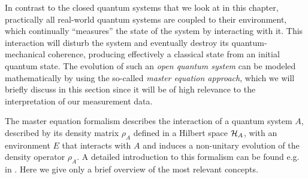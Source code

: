In contrast to the closed quantum systems that we look at in this chapter, practically all real-world quantum systems are coupled to their environment, which continually ``measures'' the state of the system by interacting with it. This interaction will disturb the system and eventually destroy its quantum-mechanical coherence, producing effectively a classical state from an initial quantum state. The evolution of such an {\it open quantum system} can be modeled mathematically by using the so-called {\it master equation approach}, which we will briefly discuss in this section since it will be of high relevance to the interpretation of our measurement data.

\smallskip

The master equation formalism describes the interaction of a quantum system $A$, described by its density matrix $\rho_A$ defined in a Hilbert space $\begin{mathcal}H\end{mathcal}_A$, with an environment $E$ that interacts with $A$ and induces a non-unitary evolution of the density operator $\rho_A$. A detailed introduction to this formalism can be found e.g. in \citep{haroche_exploring_2006}. Here we give only a brief overview of the most relevant concepts.

\smallskip

